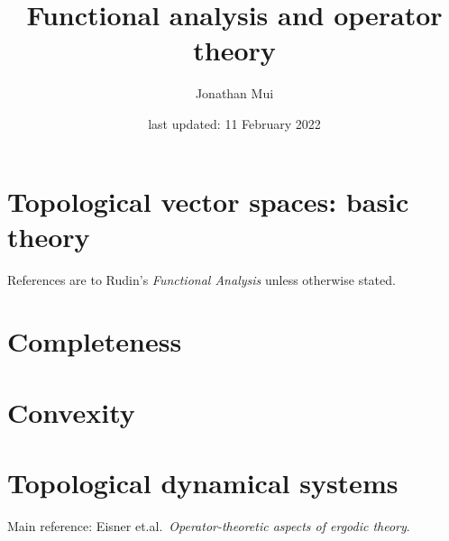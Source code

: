\documentclass[11pt]{article}
\title{Functional analysis and operator theory}
\author{Jonathan Mui}
\date{last updated: 11 February 2022}
\begin{document}
	
	\maketitle
	
	\tableofcontents
	
	\section{Topological vector spaces: basic theory}
	References are to Rudin's \emph{Functional Analysis} unless otherwise stated.
	
	
	\section{Completeness}
	
	
	\section{Convexity}
	
	
	\section{Topological dynamical systems}
	Main reference: Eisner et.al.\, \emph{Operator-theoretic aspects of ergodic theory}.
	
	
\end{document}
